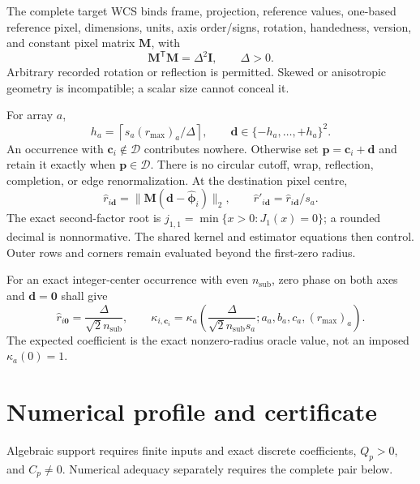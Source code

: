 \documentclass[10pt]{article}
\begin{document}
The complete target WCS binds frame, projection, reference values, one-based
reference pixel, dimensions, units, axis order/signs, rotation, handedness,
version, and constant pixel matrix $\mathbf M$, with
\[
 \mathbf M^{\mathsf T}\mathbf M=\Delta^2\mathbf I,\qquad\Delta>0.
\]
Arbitrary recorded rotation or reflection is permitted.  Skewed or
anisotropic geometry is incompatible; a scalar size cannot conceal it.

For array $a$,
\[
 h_a=\left\lceil s_a(r_{\max})_a/\Delta\right\rceil,\qquad
 \boldsymbol d\in\{-h_a,\ldots,+h_a\}^2.
\]
An occurrence with $\boldsymbol c_i\notin\mathcal D$ contributes nowhere.
Otherwise set
$\boldsymbol p=\boldsymbol c_i+\boldsymbol d$ and retain it exactly when
$\boldsymbol p\in\mathcal D$.  There is no circular cutoff, wrap, reflection,
completion, or edge renormalization.  At the destination pixel centre,
\[
 \widehat r_{i\boldsymbol d}=
 \lVert\mathbf M(\boldsymbol d-\widehat{\boldsymbol\phi}_i)\rVert_2,\qquad
 \widehat r'_{i\boldsymbol d}=\widehat r_{i\boldsymbol d}/s_a.
\]
The exact second-factor root is
$j_{1,1}=\min\{x>0:J_1(x)=0\}$; a rounded decimal is nonnormative.  The shared
kernel and estimator equations then control.  Outer rows and corners remain
evaluated beyond the first-zero radius.

For an exact integer-center occurrence with even $n_{\mathrm{sub}}$, zero
phase on both axes and $\boldsymbol d=\boldsymbol0$ shall give
\[
 \widehat r_{i\boldsymbol0}=\frac{\Delta}{\sqrt{2}n_{\mathrm{sub}}},
 \qquad
 \kappa_{i,\boldsymbol c_i}=\kappa_a\!\left(
 \frac{\Delta}{\sqrt{2}n_{\mathrm{sub}}s_a};
 a_a,b_a,c_a,(r_{\max})_a\right).
\]
The expected coefficient is the exact nonzero-radius oracle value, not an
imposed $\kappa_a(0)=1$.

\section{Numerical profile and certificate}
\label{sec:eng-numerical-profile}

Algebraic support requires finite inputs and exact discrete coefficients,
$Q_p>0$, and $C_p\ne0$.  Numerical adequacy separately requires the complete
pair below.
\end{document}
